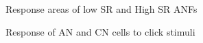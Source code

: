 \begin{figure}[tbp]
\begin{center}
\caption{Response areas of low SR and High SR ANFs }
\label{fig:CochlearTTCs}
\end{center}
\end{figure}


\begin{figure}[tbh]
\begin{center}
\caption{Response of AN and CN cells to click stimuli }
\label{fig:ClickDelayAN}
\end{center}
\end{figure}







